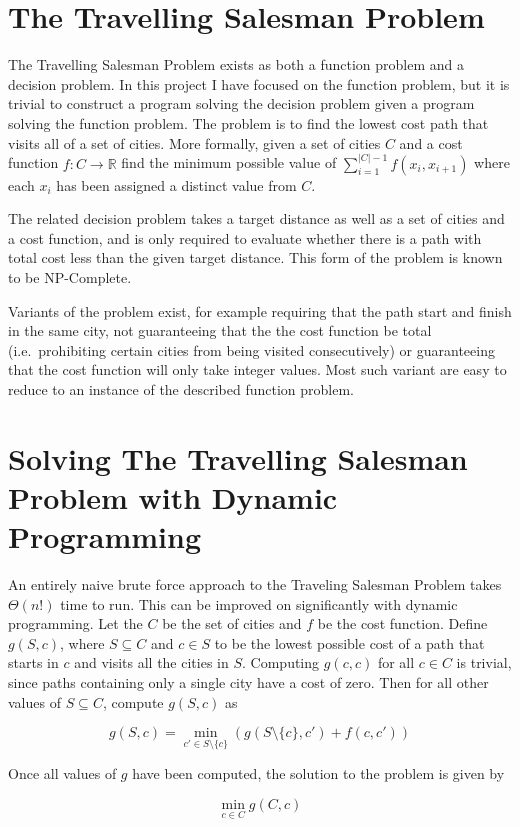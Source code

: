 \documentclass[12pt,a4paper,twoside,openright]{report}
\begin{document}
\section{The Travelling Salesman Problem}
The Travelling Salesman Problem exists as both a function problem and a decision problem. In this project I have focused on the function problem, but it is trivial to construct a program solving the decision problem given a program solving the function problem. The problem is to find the lowest cost path that visits all of a set of cities. More formally, given a set of cities $C$ and a cost function $f: C\to\mathbb{R}$ find the minimum possible value of $\sum_{i=1}^{|C|-1}f(x_i,x_{i+1})$ where each $x_i$ has been assigned a distinct value from $C$.

The related decision problem takes a target distance as well as a set of cities and a cost function, and is only required to evaluate whether there is a path with total cost less than the given target distance. This form of the problem is known to be NP-Complete.

Variants of the problem exist, for example requiring that the path start and finish in the same city, not guaranteeing that the the cost function be total (i.e.\ prohibiting certain cities from being visited consecutively) or guaranteeing that the cost function will only take integer values. Most such variant are easy to reduce to an instance of the described function problem.

\section{Solving The Travelling Salesman Problem with Dynamic Programming}
An entirely naive brute force approach to the Traveling Salesman Problem takes $\Theta(n!)$ time to run. This can be improved on significantly with dynamic programming. Let the $C$ be the set of cities and $f$ be the cost function. Define $g(S, c)$, where $S\subseteq C$ and $c\in S$ to be the lowest possible cost of a path that starts in $c$ and visits all the cities in $S$. Computing $g({c}, c)$ for all $c\in C$ is trivial, since paths containing only a single city have a cost of zero. Then for all other values of $S\subseteq C$, compute $g(S,c)$ as 

$$
g(S,c)=\min_{c'\in S\setminus\{c\}}(g(S\setminus\{c\},c') + f(c,c'))
$$

Once all values of $g$ have been computed, the solution to the problem is given by

$$
\min_{c\in C} g(C,c)
$$
\end{document}
